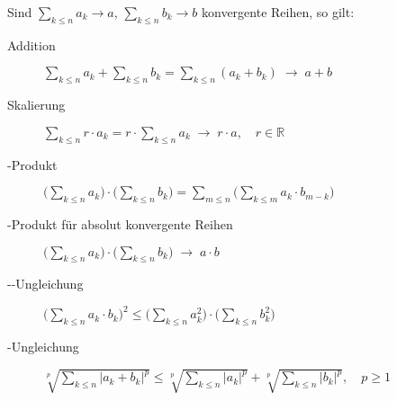 Sind $\sum_{k \leq n} a_k \to a$, $\sum_{k \leq n} b_k \to b$ konvergente Reihen, so gilt:
\begin{description}
  \item [Addition] 
	$\sum_{k \leq n} a_k + \sum_{k \leq n} b_k = \sum_{k \leq n} (a_k+b_k) \;\to\; a+b$
  \item [Skalierung] 
	$\sum_{k \leq n} r \cdot a_k = r \cdot \sum_{k \leq n} a_k \;\to\; r \cdot a, \quad r\in\mathbb{R}$
  \item [-Produkt] \label{Cauchy-Produkt}
	$\bigl(\sum_{k \leq n} a_k\bigr) \cdot \bigl(\sum_{k \leq n} b_k\bigr)
	  = \sum_{m \leq n} \bigl( \sum_{k \leq m} a_k \cdot b_{m-k} \bigr)$
  \item [-Produkt für absolut konvergente Reihen]
	$\bigl(\sum_{k \leq n} a_k\bigr) \cdot \bigl(\sum_{k \leq n} b_k\bigr) \;\to\; a \cdot b$
  \item [--Ungleichung] 
	$\bigl(\sum_{k \leq n} a_k \cdot b_k\bigr)^2
        \leq \bigl(\sum_{k \leq n} a_k^2\bigr) \cdot \bigl(\sum_{k \leq n} b_k^2\bigr)$
  \item [-Ungleichung] 
	$\sqrt[p]{\sum_{k \leq n} \lvert a_k + b_k \rvert^p}
        \leq \sqrt[p]{\sum_{k \leq n} \lvert a_k \rvert^p} + \sqrt[p]{\sum_{k \leq n} \lvert b_k \rvert^p}, \quad p \geq 1$
\end{description}


